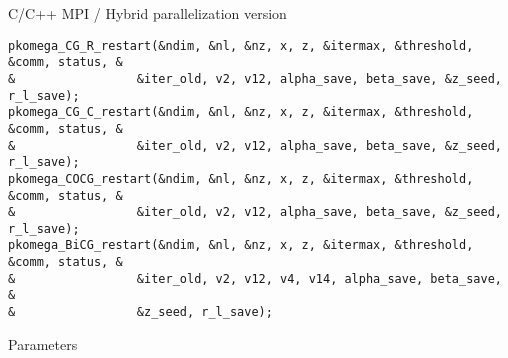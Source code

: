 \documentclass[12pt,titlepage]{article}
\begin{document}
\noindent C/C++ MPI / Hybrid parallelization version
  
\begin{verbatim}
pkomega_CG_R_restart(&ndim, &nl, &nz, x, z, &itermax, &threshold, &comm, status, &
&                 &iter_old, v2, v12, alpha_save, beta_save, &z_seed, r_l_save);
pkomega_CG_C_restart(&ndim, &nl, &nz, x, z, &itermax, &threshold, &comm, status, &
&                 &iter_old, v2, v12, alpha_save, beta_save, &z_seed, r_l_save);
pkomega_COCG_restart(&ndim, &nl, &nz, x, z, &itermax, &threshold, &comm, status, &
&                 &iter_old, v2, v12, alpha_save, beta_save, &z_seed, r_l_save);
pkomega_BiCG_restart(&ndim, &nl, &nz, x, z, &itermax, &threshold, &comm, status, &
&                 &iter_old, v2, v12, v4, v14, alpha_save, beta_save, &
&                 &z_seed, r_l_save);
\end{verbatim}


\noindent Parameters
\end{document}
